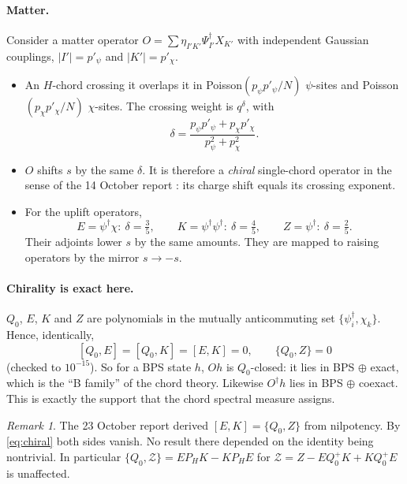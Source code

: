 \documentclass[11pt]{article}
\newcommand{\PH}{P_{\!H}}
\newcommand{\Zc}{\mathcal Z}
\theoremstyle{plain}
\theoremstyle{remark}
\newtheorem*{remark}{Remark}
\numberwithin{equation}{section}
\begin{document}
\paragraph{Matter.} Consider a matter operator $O=\sum\eta_{I'K'}\Psi_{I'}^\dagger X_{K'}$ with independent Gaussian
couplings, $|I'|=p'_\psi$ and $|K'|=p'_\chi$.
\begin{itemize}\itemsep1pt
\item An $H$-chord crossing it overlaps it in Poisson$(p_\psi p'_\psi/N)$ $\psi$-sites and Poisson$(p_\chi p'_\chi/N)$
  $\chi$-sites. The crossing weight is $q^\delta$, with
  \begin{equation}\label{eq:delta}
  \delta=\frac{p_\psi p'_\psi+p_\chi p'_\chi}{p_\psi^2+p_\chi^2}.
  \end{equation}
\item $O$ shifts $s$ by the same $\delta$. It is therefore a \emph{chiral} single-chord operator in the sense of the
  14 October report \cite{prog1014}: its charge shift equals its crossing exponent.
\item For the uplift operators,
  \begin{equation}\label{eq:deltas}
  E=\psi^\dagger\chi:\ \delta=\tfrac35,\qquad K=\psi^\dagger\psi^\dagger:\ \delta=\tfrac45,\qquad Z=\psi^\dagger:\ \delta=\tfrac25 .
  \end{equation}
  Their adjoints lower $s$ by the same amounts. They are mapped to raising operators by the mirror $s\to-s$.
\end{itemize}

\paragraph{Chirality is exact here.} $Q_0$, $E$, $K$ and $Z$ are polynomials in the mutually anticommuting set
$\{\psi_i^\dagger,\chi_k\}$. Hence, identically,
\begin{equation}\label{eq:chiral}
[Q_0,E]=[Q_0,K]=[E,K]=0,\qquad \{Q_0,Z\}=0
\end{equation}
(checked to $10^{-15}$). So for a BPS state $h$, $Oh$ is $Q_0$-closed: it lies in BPS $\oplus$ exact, which is the
``B family'' of the chord theory. Likewise $O^\dagger h$ lies in BPS $\oplus$ coexact. This is exactly the support that the
chord spectral measure assigns.

\begin{remark}
The 23 October report derived $[E,K]=\{Q_0,Z\}$ from nilpotency. By \eqref{eq:chiral} both sides vanish. No result there
depended on the identity being nontrivial. In particular $\{Q_0,\Zc\}=E\PH K-K\PH E$ for $\Zc=Z-EQ_0^+K+KQ_0^+E$ is
unaffected.
\end{remark}
\end{document}
